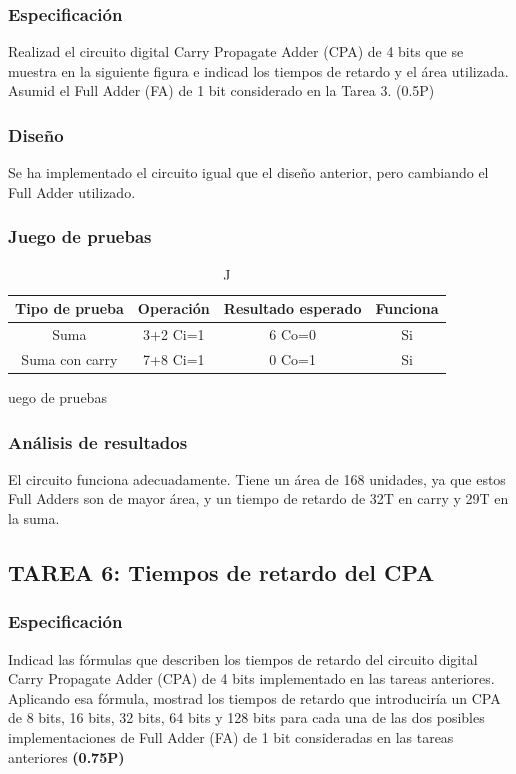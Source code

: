 \documentclass{article}
\begin{document}
		\subsubsection*{Especificación}
		Realizad el circuito digital Carry Propagate Adder (CPA) de 4 bits que se muestra en la siguiente figura e indicad los tiempos de retardo y el área utilizada.
		Asumid el Full Adder (FA) de 1 bit considerado en la Tarea 3. (0.5P)


		\subsubsection*{Diseño}
		Se ha implementado el circuito igual que el diseño anterior, pero cambiando el Full Adder utilizado.


		\subsubsection*{Juego de pruebas}
		\begin{table}[h]
			\begin{center}
				\begin{tabular}{| c | c | c | c |}
					\hline
					Tipo de prueba & Operación & Resultado esperado & Funciona \\ \hline
						
					Suma & 3+2 Ci=1 & 6 Co=0 & Si \\ \hline
					Suma con carry & 7+8 Ci=1 & 0 Co=1 & Si \\ \hline
	
				\end{tabular}
				\caption Juego de pruebas
			\end{center}
		\end{table}



		\subsubsection*{Análisis de resultados}
		El circuito funciona adecuadamente. Tiene un área de 168 unidades, ya que estos Full Adders son de mayor área, y un tiempo de retardo de 32T en carry y 29T en la suma.
	\subsection{TAREA 6: Tiempos de retardo del CPA}
		\subsubsection*{Especificación}
		Indicad las fórmulas que describen los tiempos de retardo del circuito digital Carry Propagate Adder (CPA) de 4 bits implementado en las tareas anteriores.
		Aplicando esa fórmula, mostrad los tiempos de retardo que introduciría un CPA de 8 bits, 16 bits, 32 bits, 64 bits y 128 bits para cada una de las dos posibles implementaciones de Full Adder (FA) de 1 bit consideradas en las tareas anteriores \textbf{(0.75P)}
\end{document}
